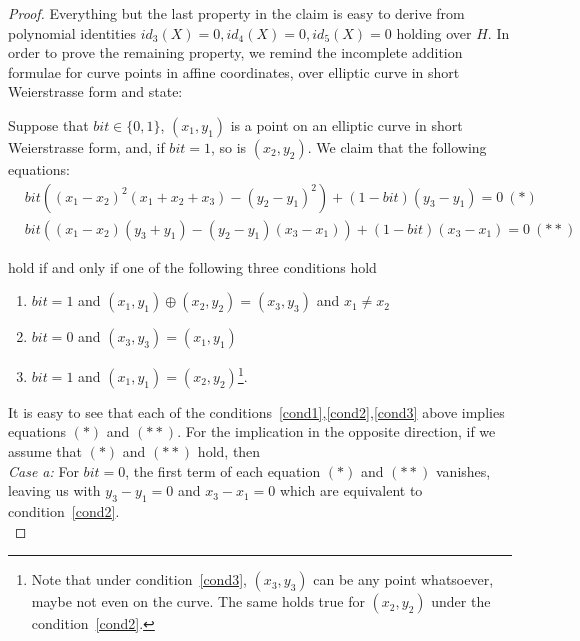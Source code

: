 \begin{proof} Everything but the last property in the claim is easy to derive from polynomial identities 
$id_3(X) =0, id_4(X )= 0, id_5(X) = 0$ holding over $H$. In order to prove the remaining property, we remind 
the incomplete addition formulae for curve points in affine coordinates, over elliptic curve in short Weierstrasse form and state:\\ 

\begin{observation}  
\label{obs:incomplete_addition} 
Suppose that $\mathit{bit} \in \{0,1\}$, $(x_1,y_1)$ is a point on an elliptic curve in short Weierstrasse form, and, if 
$\mathit{bit} = 1$, so is $(x_2,y_2)$. We claim that the following equations: 
\begin{align*}
&\mathit{bit}((x_1 - x_2)^2 (x_1 + x_2 + x_3) - (y_2 - y_1)^2 ) + (1 - \mathit{bit})(y_3 - y_1) =0 \ (\ast)\\
&\mathit{bit}((x_1 - x_2)(y_3 + y_1) - (y_2 - y_1)(x_3 - x_1)) + (1 - \mathit{bit})(x_3 - x_1) =0 \ (\ast\ast)
\end{align*}
\end{observation}

\noindent hold if and only if one of the following three conditions hold 

\begin{enumerate}
\item \label{cond1} $\mathit{bit}=1$ and $(x_1,y_1)\oplus(x_2,y_2)=(x_3,y_3)$ and $x_1 \neq x_2$
\item \label{cond2} $\mathit{bit}=0$ and $(x_3,y_3)=(x_1,y_1)$ 
\item  \label{cond3} $\mathit{bit}=1$ and $(x_1,y_1)=(x_2,y_2)$\footnote{Note that under condition~\ref{cond3}, $(x_3,y_3)$ 
can be any point whatsoever, maybe not even on the curve. The same holds true for $(x_2, y_2)$ under the condition~\ref{cond2}.}.
\end{enumerate}

\noindent It is easy to see that each of the conditions~\ref{cond1},\ref{cond2},\ref{cond3} above implies equations $(\ast)$ and $(\ast \ast)$.
\noindent For the implication in the opposite direction, if we assume that $(\ast)$ and $(\ast \ast)$ hold, then \\

\noindent \textit{Case a:} For $\mathit{bit}=0$, the first term of each equation $(\ast)$ and $(\ast \ast)$ vanishes, 
leaving us with $y_3-y_1=0$ and $x_3-x_1=0$ which are equivalent to condition~\ref{cond2}. \\


\end{proof}
